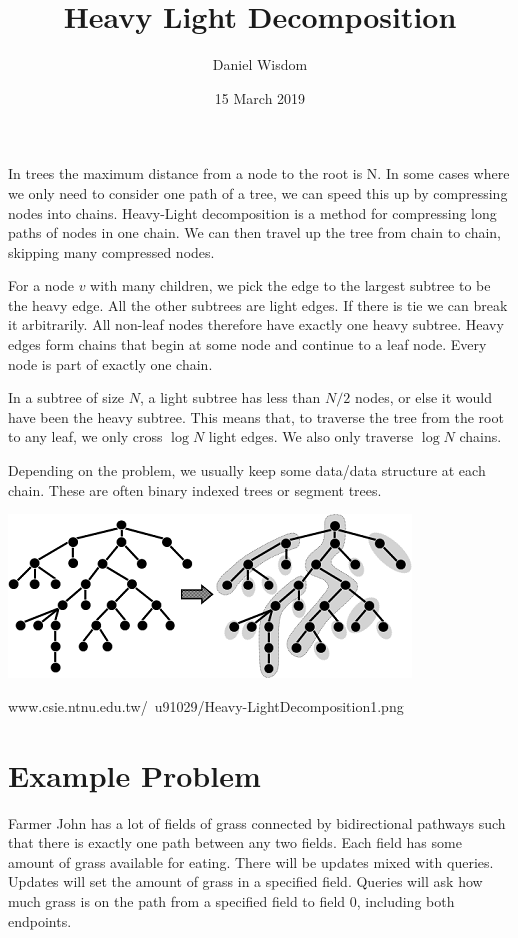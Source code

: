 \documentclass{article}
\title{Heavy Light Decomposition}
\author{Daniel Wisdom}
\date{15 March 2019}
\begin{document}
\maketitle



In trees the maximum distance from a node to the root is N.  In some cases where we only need to consider one path of a tree, we can speed this up by compressing nodes into chains.  Heavy-Light decomposition is a method for compressing long paths of nodes in one chain.  We can then travel up the tree from chain to chain, skipping many compressed nodes.

For a node $v$ with many children, we pick the edge to the largest subtree to be the heavy edge.  All the other subtrees are light edges.  If there is tie we can break it arbitrarily.  All non-leaf nodes therefore have exactly one heavy subtree.  Heavy edges form chains that begin at some node and continue to a leaf node.  Every node is part of exactly one chain.

In a subtree of size $N$, a light subtree has less than $N/2$ nodes, or else it would have been the heavy subtree.  This means that, to traverse the tree from the root to any leaf, we only cross $\log N$ light edges.  We also only traverse $\log N$ chains.

Depending on the problem, we usually keep some data/data structure at each chain.  These are often binary indexed trees or segment trees.

\begin{center}
    \includegraphics{Heavy-LightDecomposition1.png}
    
    www.csie.ntnu.edu.tw/~u91029/Heavy-LightDecomposition1.png
\end{center}

\section{Example Problem}

Farmer John has a lot of fields of grass connected by bidirectional pathways such that there is exactly one path between any two fields.  Each field has some amount of grass available for eating.  There will be updates mixed with queries.  Updates will set the amount of grass in a specified field.  Queries will ask how much grass is on the path from a specified field to field 0, including both endpoints.
\end{document}
